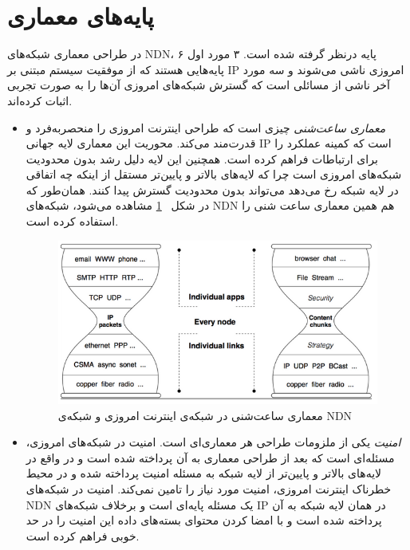 \section{پایه‌های معماری}
در طراحی معماری شبکه‌های NDN، ۶ پایه درنظر گرفته شده است. ۳ مورد اول پایه‌هایی هستند که از موفقیت سیستم مبتنی بر IP امروزی ناشی می‌شوند و سه مورد آخر ناشی از مسائلی است که گسترش شبکه‌های امروزی آن‌ها را به صورت تجربی اثبات کرده‌اند. 
\begin{itemize}
\item{
\textit{معماری ساعت‌شنی}
 چیزی است که طراحی اینترنت امروزی را منحصربه‌فرد و قدرت‌مند می‌کند. محوریت این معماری لایه جهانی IP  است که کمینه عملکرد را برای ارتباطات فراهم کرده است. همچنین این لایه دلیل رشد بدون محدودیت شبکه‌های امروزی است چرا که لایه‌های بالاتر و پایین‌تر مستقل از اینکه چه اتفاقی در لایه شبکه رخ می‌دهد می‌تواند بدون محدودیت گسترش پیدا کنند. همان‌طور که در شکل
~\ref{fig:hourglass}
  مشاهده می‌شود، شبکه‌های NDN هم همین معماری ساعت شنی را استفاده کرده است. 


\begin{figure}[H]
\centering
\includegraphics[scale=0.8]{./resources/figures/3_hourglass.png}
\caption{معماری ساعت‌شنی در شبکه‌‌ی اینترنت امروزی و شبکه‌ی NDN}
\label{fig:hourglass}
\end{figure}




} 

\item{
\textit{امنیت}
 یکی از ملزومات طراحی هر معماری‌ای است. امنیت در شبکه‌های امروزی، مسئله‌ای است که بعد از طراحی معماری به آن پرداخته شده است و در واقع در لایه‌های بالاتر و پایین‌تر از لایه شبکه به مسئله امنیت پرداخته شده و در محیط خطرناک اینترنت امروزی، امنیت مورد نیاز را تامین نمی‌کند. امنیت در شبکه‌های NDN یک مسئله پایه‌ای است و برخلاف شبکه‌های IP در همان لایه شبکه به آن پرداخته شده است و با امضا کردن محتوای بسته‌های داده این امنیت را در حد خوبی فراهم کرده است. 

}
\end{itemize}
